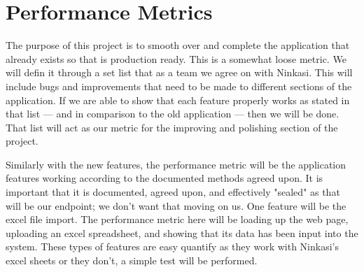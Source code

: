 \documentclass[draftclsnofoot,onecolumn,letterpaper,compsoc,10pt]{IEEEtran}
\begin{document}
\section{Performance Metrics}
The purpose of this project is to smooth over and complete the application that already exists so that is production ready.  This is a somewhat loose metric.  We will defin it through a set list that as a team we agree on with Ninkasi.  This will include bugs and improvements that need to be made to different sections of the application.  If we are able to show that each feature properly works as stated in that list --- and in comparison to the old application --- then we will be done.  That list will act as our metric for the improving and polishing section of the project.

Similarly with the new features, the performance metric will be the application features working according to the documented methods agreed upon.  It is important that it is documented, agreed upon, and effectively "sealed" as that will be our endpoint; we don't want that moving on us.  One feature will be the excel file import.  The performance metric here will be loading up the web page, uploading an excel spreadsheet, and showing that its data has been input into the system.  These types of features are easy quantify as they work with Ninkasi's excel sheets or they don't, a simple test will be performed.


%
%
\end{document}
